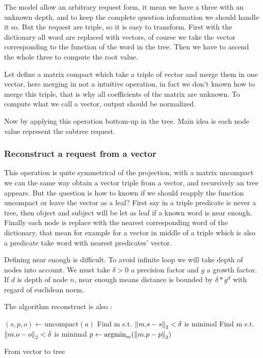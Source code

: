 The model allow an arbitrary request form, it mean we have a three with an unknown depth, and to keep the complete question information we should handle it so. But the request are triple, so it is easy to transform. First with the dictionary all word are replaced with vectors, of course we take the vector corresponding to the function of the word in the tree. Then we have to ascend the whole three to compute the root value.

Let define a matrix compact which take a triple of vector and merge them in one vector, here merging in not a intuitive operation, in fact we don't known how to merge this triple, that is why all coefficients of the matrix are unknown. To compute what we call a vector, output should be normalized.

Now by applying this operation bottom-up in the tree. Main idea is each node value represent the subtree request.


\subsubsection{Reconstruct a request from a vector}

This operation is quite symmetrical of the projection, with a matrix uncompact we can the same way obtain a vector triple from a vector, and recursively an tree appears. But the question is how to known if we should reapply the function uncompact or leave the vector as a leaf? First say in a triple predicate is never a tree, then object and subject will be let as leaf if a known word is near enough. Finally each node is replace with the nearest corresponding word of the dictionary, that mean for example for a vector in middle of a triple which is also a predicate take word with nearest predicates' vector.

Defining near enough is difficult. To avoid infinite loop we will take depth of nodes into account. We must take $\delta>0$ a precision factor and $g$ a growth factor. If $d$ is depth of node $n$, near enough means distance is bounded by $\delta*g^d$ with regard of euclidean norm.  

The algorithm reconstruct is also :



\begin{algorithm}[H]
    \DontPrintSemicolon  %
    $(s,p,o) \gets \text{uncompact}(a)$\;
    Find m s.t. $\left\|m.s-s\right\|_2<\delta$ is minimal \;
    Find m s.t. $\left\|m.o-o\right\|_2<\delta$ is minimal \;
    $p \gets {\text{argmin}}_m  (\left\|m.p-p\right\|_2)$\;
    \;
    \caption{From vector to tree}
\end{algorithm}

